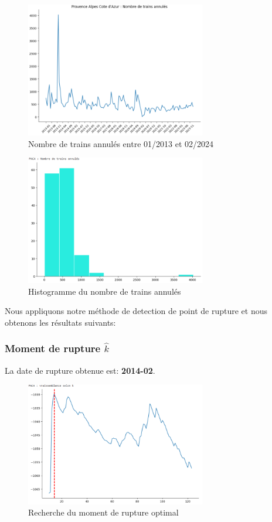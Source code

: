 {\begin{figure}[H]
  \centering
  \includegraphics[width=0.7\textwidth]{PACA_TA_1.png}
  \caption{Nombre de trains annulés entre 01/2013 et 02/2024}
\end{figure}

\begin{figure}[H]
  \centering
  \includegraphics[width=0.7\textwidth]{PACA_TA_2.png}
  \caption{Histogramme du nombre de trains annulés}
\end{figure}

Nous appliquons notre méthode de detection de point de rupture et nous obtenons les résultats suivants:

\subsubsection{Moment de rupture $\hat{k}$}

La date de rupture obtenue est: \textbf{2014-02}. 

\begin{figure}[H]
  \centering
  \includegraphics[width=0.7\textwidth]{PACA_TA_3_bis.png}
  \caption{Recherche du moment de rupture optimal}
\end{figure}

}
